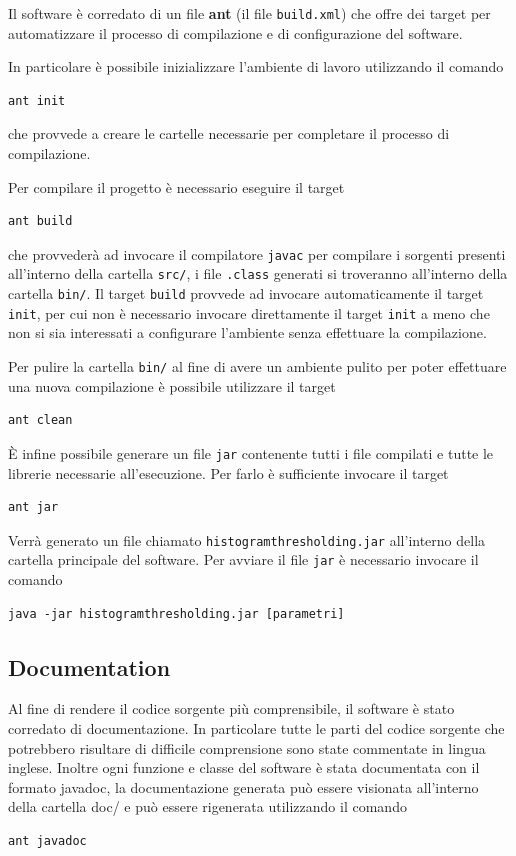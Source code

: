 \documentclass[a4paper,10pt]{article}
\begin{document}
Il software \`e corredato di un file \textbf{ant} (il file \texttt{build.xml}) che offre dei target per automatizzare il processo di compilazione e di configurazione del software.

In particolare \`e possibile inizializzare l'ambiente di lavoro utilizzando il comando
\begin{lstlisting}
ant init
\end{lstlisting}
che provvede a creare le cartelle necessarie per completare il processo di compilazione.

Per compilare il progetto \`e necessario eseguire il target 
\begin{lstlisting}
ant build
\end{lstlisting}
che provveder\`a ad invocare il compilatore \texttt{javac} per compilare i sorgenti presenti all'interno della cartella \texttt{src/}, i file \texttt{.class} generati si troveranno all'interno della cartella \texttt{bin/}. Il target \texttt{build} provvede ad invocare automaticamente il target \texttt{init}, per cui non \`e necessario invocare direttamente il target \texttt{init} a meno che non si sia interessati a configurare l'ambiente senza effettuare la compilazione.

Per pulire la cartella \texttt{bin/} al fine di avere un ambiente pulito per poter effettuare una nuova compilazione \`e possibile utilizzare il target
\begin{lstlisting}
ant clean
\end{lstlisting}

\`E infine possibile generare un file \texttt{jar} contenente tutti i file compilati e tutte le librerie necessarie all'esecuzione. Per farlo \`e sufficiente invocare il target
\begin{lstlisting}
ant jar
\end{lstlisting}
Verr\`a generato un file chiamato \texttt{histogramthresholding.jar} all'interno della cartella principale del software.
Per avviare il file \texttt{jar} \`e necessario invocare il comando
\begin{lstlisting}
java -jar histogramthresholding.jar [parametri]
\end{lstlisting}

\subsection{Documentation}

Al fine di rendere il codice sorgente pi\`u comprensibile, il software \`e stato corredato di documentazione. In particolare tutte le parti del codice sorgente che potrebbero risultare di difficile comprensione sono state commentate in lingua inglese. Inoltre ogni funzione e classe del software \`e stata documentata con il formato \textsf {javadoc}, la documentazione generata pu\`o essere visionata all'interno della cartella \textsf{doc/} e pu\`o essere rigenerata utilizzando il comando
\begin{lstlisting}
ant javadoc
\end{lstlisting}
\end{document}
